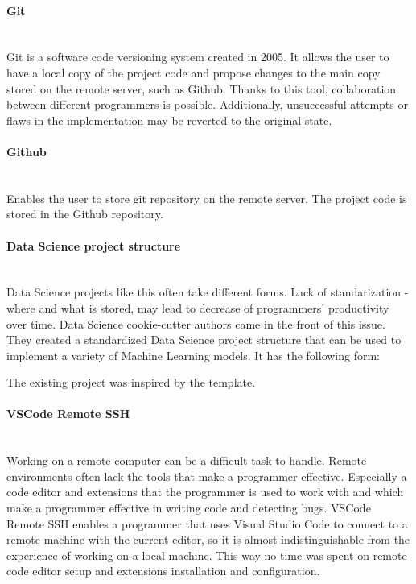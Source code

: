 \paragraph{Git}\mbox{}\\
\indent Git is a software code versioning system created in 2005. It allows the user to have a local copy of the project code and propose changes to the main copy stored on the remote server, such as Github. Thanks to this tool, collaboration between different programmers is possible. Additionally, unsuccessful attempts or flaws in the implementation may be reverted to the original state.
\paragraph{Github}\mbox{}\\
\indent Enables the user to store git repository on the remote server. The project code is stored in the Github repository.
\paragraph{Data Science project structure}\mbox{}\\
\indent Data Science projects like this often take different forms. Lack of standarization - where and what is stored, may lead to decrease of programmers' productivity over time. Data Science cookie-cutter authors came in the front of this issue. They created a standardized Data Science project structure that can be used to implement a variety of Machine Learning models. 
It has the following form:




The existing project was inspired by the template.
\paragraph{VSCode Remote SSH}\mbox{}\\
\indent Working on a remote computer can be a difficult task to handle. Remote environments often lack the tools that make a programmer effective. Especially a code editor and extensions that the programmer is used to work with and which make a programmer effective in writing code and detecting bugs. VSCode Remote SSH enables a programmer that uses Visual Studio Code to connect to a remote machine with the current editor, so it is almost indistinguishable from the experience of working on a local machine. This way no time was spent on remote code editor setup and extensions installation and configuration. 

